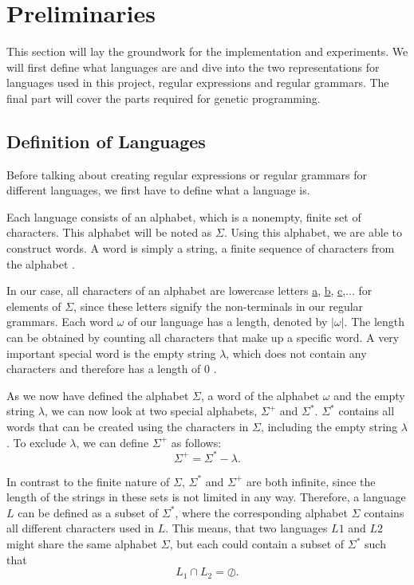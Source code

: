 \documentclass[runningheads]{llncs}
\begin{document}
\section{Preliminaries}
This section will lay the groundwork for the implementation and experiments. We will first define what languages are and dive into the two representations for languages used in this project, regular expressions and regular grammars. The final part will cover the parts required for genetic programming.

\subsection{Definition of Languages}
Before talking about creating regular expressions or regular grammars for different languages, we first have to define what a language is.

Each language consists of an alphabet, which is a nonempty, finite set of characters. This alphabet will be noted as $\Sigma$.
Using this alphabet, we are able to construct words. A word is simply a string, a finite sequence of characters from the alphabet \cite[17]{fla-2017}.

In our case, all characters of an alphabet are lowercase letters \underline{a}, \underline{b}, \underline{c},... for elements of $\Sigma$, since these letters signify the non-terminals in our regular grammars.
Each word $\omega$ of our language has a length, denoted by $|\omega|$. The length can be obtained by counting all characters that make up a specific word. A very important special word is the empty string $\lambda$, which does not contain any characters and therefore has a length of 0 \cite[17]{fla-2017}.

As we now have defined the alphabet $\Sigma$, a word of the alphabet $\omega$ and the empty string $\lambda$, we can now look at two special alphabets, $\Sigma^{+}$ and $\Sigma^{*}$. $\Sigma^{*}$ contains all words that can be created using the characters in $\Sigma$, including the empty string $\lambda$. To exclude $\lambda$, we can define $\Sigma^{+}$ as follows:
\begin{equation}
\Sigma^{+}=\Sigma^{*} - {\lambda}.
\end{equation}

In contrast to the finite nature of $\Sigma$, $\Sigma^{*}$ and $\Sigma^{+}$ are both infinite, since the length of the strings in these sets is not limited in any way. Therefore, a language $L$ can be defined as a subset of $\Sigma^{*}$, where the corresponding alphabet $\Sigma$ contains all different characters used in $L$. This means, that two languages $L1$ and $L2$ might share the same alphabet $\Sigma$, but each could contain a subset of $\Sigma^{*}$ such that
\begin{equation}
L_{1} \cap L_{2} = \oslash .
\end{equation}
\end{document}

